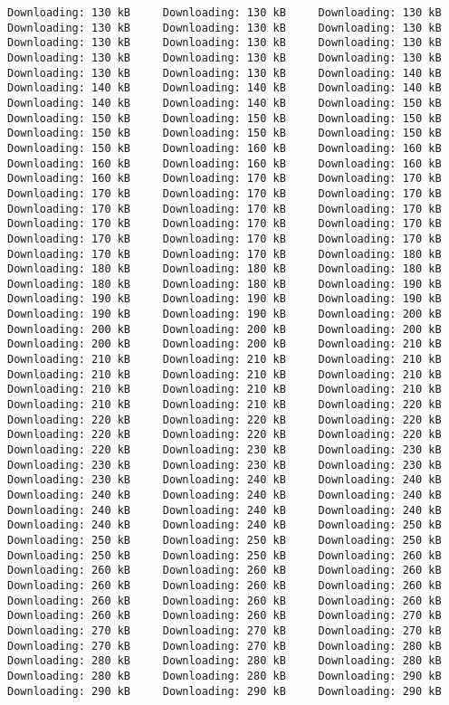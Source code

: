 \documentclass[gc, manuscript]{copernicus}
\begin{document}
\begin{verbatim}
Downloading: 130 kB     Downloading: 130 kB     Downloading: 130 kB     Downloading: 130 kB     Downloading: 130 kB     Downloading: 130 kB     Downloading: 130 kB     Downloading: 130 kB     Downloading: 130 kB     Downloading: 130 kB     Downloading: 130 kB     Downloading: 130 kB     Downloading: 130 kB     Downloading: 130 kB     Downloading: 140 kB     Downloading: 140 kB     Downloading: 140 kB     Downloading: 140 kB     Downloading: 140 kB     Downloading: 140 kB     Downloading: 150 kB     Downloading: 150 kB     Downloading: 150 kB     Downloading: 150 kB     Downloading: 150 kB     Downloading: 150 kB     Downloading: 150 kB     Downloading: 150 kB     Downloading: 160 kB     Downloading: 160 kB     Downloading: 160 kB     Downloading: 160 kB     Downloading: 160 kB     Downloading: 160 kB     Downloading: 170 kB     Downloading: 170 kB     Downloading: 170 kB     Downloading: 170 kB     Downloading: 170 kB     Downloading: 170 kB     Downloading: 170 kB     Downloading: 170 kB     Downloading: 170 kB     Downloading: 170 kB     Downloading: 170 kB     Downloading: 170 kB     Downloading: 170 kB     Downloading: 170 kB     Downloading: 170 kB     Downloading: 170 kB     Downloading: 180 kB     Downloading: 180 kB     Downloading: 180 kB     Downloading: 180 kB     Downloading: 180 kB     Downloading: 180 kB     Downloading: 190 kB     Downloading: 190 kB     Downloading: 190 kB     Downloading: 190 kB     Downloading: 190 kB     Downloading: 190 kB     Downloading: 200 kB     Downloading: 200 kB     Downloading: 200 kB     Downloading: 200 kB     Downloading: 200 kB     Downloading: 200 kB     Downloading: 210 kB     Downloading: 210 kB     Downloading: 210 kB     Downloading: 210 kB     Downloading: 210 kB     Downloading: 210 kB     Downloading: 210 kB     Downloading: 210 kB     Downloading: 210 kB     Downloading: 210 kB     Downloading: 210 kB     Downloading: 210 kB     Downloading: 220 kB     Downloading: 220 kB     Downloading: 220 kB     Downloading: 220 kB     Downloading: 220 kB     Downloading: 220 kB     Downloading: 220 kB     Downloading: 220 kB     Downloading: 230 kB     Downloading: 230 kB     Downloading: 230 kB     Downloading: 230 kB     Downloading: 230 kB     Downloading: 230 kB     Downloading: 240 kB     Downloading: 240 kB     Downloading: 240 kB     Downloading: 240 kB     Downloading: 240 kB     Downloading: 240 kB     Downloading: 240 kB     Downloading: 240 kB     Downloading: 240 kB     Downloading: 240 kB     Downloading: 250 kB     Downloading: 250 kB     Downloading: 250 kB     Downloading: 250 kB     Downloading: 250 kB     Downloading: 250 kB     Downloading: 260 kB     Downloading: 260 kB     Downloading: 260 kB     Downloading: 260 kB     Downloading: 260 kB     Downloading: 260 kB     Downloading: 260 kB     Downloading: 260 kB     Downloading: 260 kB     Downloading: 260 kB     Downloading: 260 kB     Downloading: 260 kB     Downloading: 270 kB     Downloading: 270 kB     Downloading: 270 kB     Downloading: 270 kB     Downloading: 270 kB     Downloading: 270 kB     Downloading: 280 kB     Downloading: 280 kB     Downloading: 280 kB     Downloading: 280 kB     Downloading: 280 kB     Downloading: 280 kB     Downloading: 290 kB     Downloading: 290 kB     Downloading: 290 kB     Downloading: 290 kB     
\end{verbatim}
\end{document}
